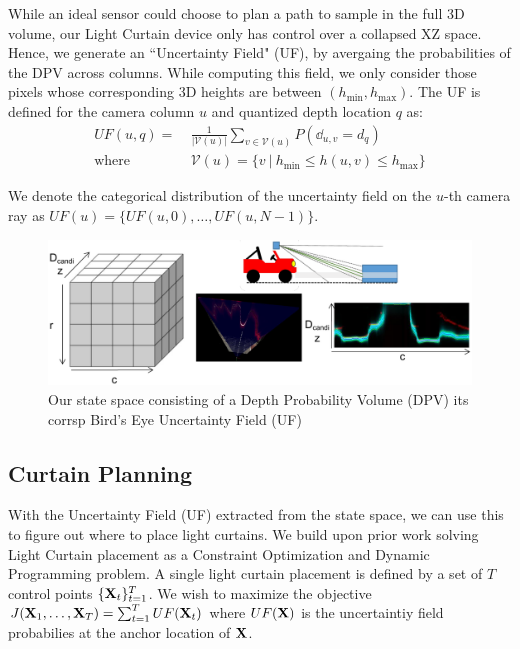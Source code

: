 While an ideal sensor could choose to plan a path to sample in the full 3D volume, our Light Curtain device only has control over a collapsed XZ  space. Hence, we generate an ``Uncertainty Field" (UF), by avergaing the probabilities of the DPV across columns. While computing this field, we only consider those pixels whose corresponding 3D heights are between $(h_\text{min}, h_\text{max})$. The UF is defined for the camera column $u$ and quantized depth location $q$ as:
\begin{align}
   UF(u, q) =\ &\frac{1}{|\mathcal{V}(u)|}\sum_{v \in \mathcal{V}(u)} P(\dd_{u, v} = d_q)\nonumber\\
   \text{where } &\mathcal{V}(u) = \{v\ |\ h_\text{min} \leq h(u, v) \leq h_\text{max}\} 
   \label{eq:collapse}
\end{align}

We denote the categorical distribution of the uncertainty field on the $u$-th camera ray as $UF(u)= \{UF(u, 0), \dots, UF(u, N-1)\}$.

\begin{figure}[h]
   \centering
   \begin{minipage}{0.5\textwidth}
       \centering
       \includegraphics[width=1.0\textwidth]{figures/bev.pdf}
   \end{minipage}\hfill
   \centering
   \caption{Our state space consisting of a Depth Probability Volume (DPV) its corrsp Bird's Eye Uncertainty Field (UF)}
\end{figure}

\subsection{Curtain Planning}

With the Uncertainty Field (UF) extracted from the state space, we can use this to figure out where to place light curtains. We build upon prior work solving Light Curtain placement as a Constraint Optimization and Dynamic Programming problem. A single light curtain placement is defined by a set of $T$ control points $\{\mathbf{X}_t\}_{t=1}^T$. We wish to maximize the objective $J(\mathbf{X}_1, \dots, \mathbf{X}_T) = \sum_{t=1}^T UF(\mathbf{X}_t)$ where $UF(\mathbf{X})$ is the uncertaintiy field probabilies at the anchor location of $\mathbf{X}$.

